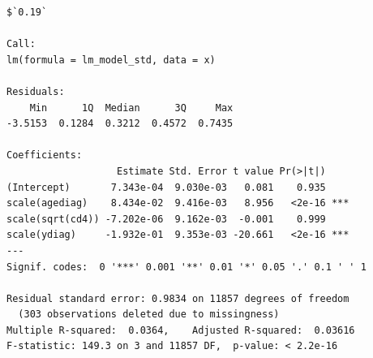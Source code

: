\documentclass[]{revtex4}\usepackage[]{graphicx}\usepackage[]{color}
\makeatletter
\newenvironment{kframe}{%
 \def\at@end@of@kframe{}%
 \ifinner\ifhmode%
  \def\at@end@of@kframe{\end{minipage}}%
  \begin{minipage}{\columnwidth}%
 \fi\fi%
 \def\FrameCommand##1{\hskip\@totalleftmargin \hskip-\fboxsep
 \colorbox{shadecolor}{##1}\hskip-\fboxsep
     \hskip-\linewidth \hskip-\@totalleftmargin \hskip\columnwidth}%
 \MakeFramed {\advance\hsize-\width
   \@totalleftmargin\z@ \linewidth\hsize
   \@setminipage}}%
 {\par\unskip\endMakeFramed%
 \at@end@of@kframe}
\newenvironment{knitrout}{}{} %
\makeatother
\begin{document}
\begin{knitrout}
\begin{kframe}
\begin{verbatim}
$`0.19`

Call:
lm(formula = lm_model_std, data = x)

Residuals:
    Min      1Q  Median      3Q     Max 
-3.5153  0.1284  0.3212  0.4572  0.7435 

Coefficients:
                   Estimate Std. Error t value Pr(>|t|)    
(Intercept)       7.343e-04  9.030e-03   0.081    0.935    
scale(agediag)    8.434e-02  9.416e-03   8.956   <2e-16 ***
scale(sqrt(cd4)) -7.202e-06  9.162e-03  -0.001    0.999    
scale(ydiag)     -1.932e-01  9.353e-03 -20.661   <2e-16 ***
---
Signif. codes:  0 '***' 0.001 '**' 0.01 '*' 0.05 '.' 0.1 ' ' 1

Residual standard error: 0.9834 on 11857 degrees of freedom
  (303 observations deleted due to missingness)
Multiple R-squared:  0.0364,	Adjusted R-squared:  0.03616 
F-statistic: 149.3 on 3 and 11857 DF,  p-value: < 2.2e-16
\end{verbatim}
\end{kframe}
\end{knitrout}
\end{document}
